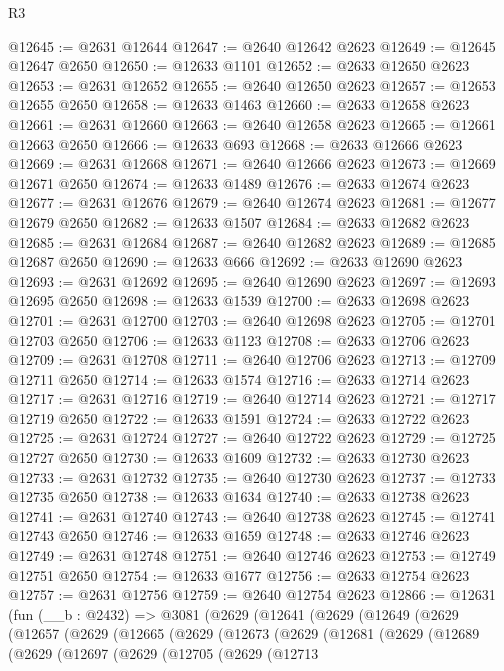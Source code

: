\begin{lexlean}{R3}
\begin{coremodule}
@12645 := @2631 @12644
@12647 := @2640 @12642 @2623
@12649 := @12645 @12647 @2650
@12650 := @12633 @1101
@12652 := @2633 @12650 @2623
@12653 := @2631 @12652
@12655 := @2640 @12650 @2623
@12657 := @12653 @12655 @2650
@12658 := @12633 @1463
@12660 := @2633 @12658 @2623
@12661 := @2631 @12660
@12663 := @2640 @12658 @2623
@12665 := @12661 @12663 @2650
@12666 := @12633 @693
@12668 := @2633 @12666 @2623
@12669 := @2631 @12668
@12671 := @2640 @12666 @2623
@12673 := @12669 @12671 @2650
@12674 := @12633 @1489
@12676 := @2633 @12674 @2623
@12677 := @2631 @12676
@12679 := @2640 @12674 @2623
@12681 := @12677 @12679 @2650
@12682 := @12633 @1507
@12684 := @2633 @12682 @2623
@12685 := @2631 @12684
@12687 := @2640 @12682 @2623
@12689 := @12685 @12687 @2650
@12690 := @12633 @666
@12692 := @2633 @12690 @2623
@12693 := @2631 @12692
@12695 := @2640 @12690 @2623
@12697 := @12693 @12695 @2650
@12698 := @12633 @1539
@12700 := @2633 @12698 @2623
@12701 := @2631 @12700
@12703 := @2640 @12698 @2623
@12705 := @12701 @12703 @2650
@12706 := @12633 @1123
@12708 := @2633 @12706 @2623
@12709 := @2631 @12708
@12711 := @2640 @12706 @2623
@12713 := @12709 @12711 @2650
@12714 := @12633 @1574
@12716 := @2633 @12714 @2623
@12717 := @2631 @12716
@12719 := @2640 @12714 @2623
@12721 := @12717 @12719 @2650
@12722 := @12633 @1591
@12724 := @2633 @12722 @2623
@12725 := @2631 @12724
@12727 := @2640 @12722 @2623
@12729 := @12725 @12727 @2650
@12730 := @12633 @1609
@12732 := @2633 @12730 @2623
@12733 := @2631 @12732
@12735 := @2640 @12730 @2623
@12737 := @12733 @12735 @2650
@12738 := @12633 @1634
@12740 := @2633 @12738 @2623
@12741 := @2631 @12740
@12743 := @2640 @12738 @2623
@12745 := @12741 @12743 @2650
@12746 := @12633 @1659
@12748 := @2633 @12746 @2623
@12749 := @2631 @12748
@12751 := @2640 @12746 @2623
@12753 := @12749 @12751 @2650
@12754 := @12633 @1677
@12756 := @2633 @12754 @2623
@12757 := @2631 @12756
@12759 := @2640 @12754 @2623
@12866 := @12631
    (fun (__b : @2432) =>
    @3081
      (@2629
        (@12641
          (@2629
            (@12649
              (@2629
                (@12657
                  (@2629
                    (@12665
                      (@2629
                        (@12673
                          (@2629
                            (@12681
                              (@2629
                                (@12689
                                  (@2629
                                    (@12697
                                      (@2629
                                        (@12705
                                          (@2629
                                            (@12713

\end{coremodule}
\end{lexlean}

